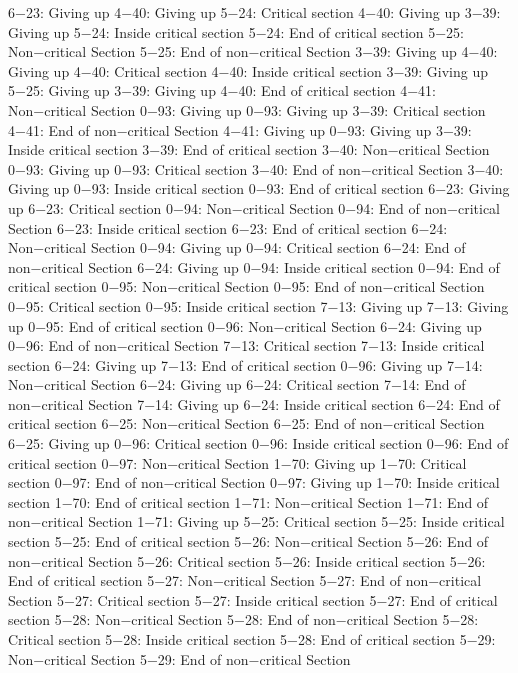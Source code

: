 6−23: Giving up
4−40: Giving up
5−24: Critical section
4−40: Giving up
3−39: Giving up
5−24: Inside critical section
5−24: End of critical section
5−25: Non−critical Section
5−25: End of non−critical Section
3−39: Giving up
4−40: Giving up
4−40: Critical section
4−40: Inside critical section
3−39: Giving up
5−25: Giving up
3−39: Giving up
4−40: End of critical section
4−41: Non−critical Section
0−93: Giving up
0−93: Giving up
3−39: Critical section
4−41: End of non−critical Section
4−41: Giving up
0−93: Giving up
3−39: Inside critical section
3−39: End of critical section
3−40: Non−critical Section
0−93: Giving up
0−93: Critical section
3−40: End of non−critical Section
3−40: Giving up
0−93: Inside critical section
0−93: End of critical section
6−23: Giving up
6−23: Critical section
0−94: Non−critical Section
0−94: End of non−critical Section
6−23: Inside critical section
6−23: End of critical section
6−24: Non−critical Section
0−94: Giving up
0−94: Critical section
6−24: End of non−critical Section
6−24: Giving up
0−94: Inside critical section
0−94: End of critical section
0−95: Non−critical Section
0−95: End of non−critical Section
0−95: Critical section
0−95: Inside critical section
7−13: Giving up
7−13: Giving up
0−95: End of critical section
0−96: Non−critical Section
6−24: Giving up
0−96: End of non−critical Section
7−13: Critical section
7−13: Inside critical section
6−24: Giving up
7−13: End of critical section
0−96: Giving up
7−14: Non−critical Section
6−24: Giving up
6−24: Critical section
7−14: End of non−critical Section
7−14: Giving up
6−24: Inside critical section
6−24: End of critical section
6−25: Non−critical Section
6−25: End of non−critical Section
6−25: Giving up
0−96: Critical section
0−96: Inside critical section
0−96: End of critical section
0−97: Non−critical Section
1−70: Giving up
1−70: Critical section
0−97: End of non−critical Section
0−97: Giving up
1−70: Inside critical section
1−70: End of critical section
1−71: Non−critical Section
1−71: End of non−critical Section
1−71: Giving up
5−25: Critical section
5−25: Inside critical section
5−25: End of critical section
5−26: Non−critical Section
5−26: End of non−critical Section
5−26: Critical section
5−26: Inside critical section
5−26: End of critical section
5−27: Non−critical Section
5−27: End of non−critical Section
5−27: Critical section
5−27: Inside critical section
5−27: End of critical section
5−28: Non−critical Section
5−28: End of non−critical Section
5−28: Critical section
5−28: Inside critical section
5−28: End of critical section
5−29: Non−critical Section
5−29: End of non−critical Section
